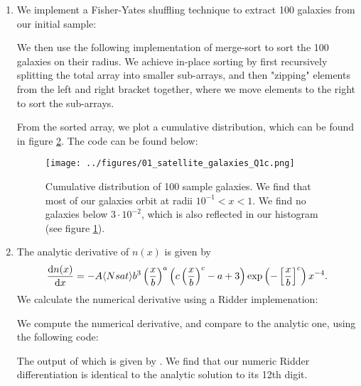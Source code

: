 \begin{enumerate}[label=(\alph*)]
{\begin{figure}[H]
    \label{fig:Q1b_hist}
\end{figure}
}
\item {We implement a Fisher-Yates shuffling technique to extract 100 galaxies from our initial sample: 

We then use the following implementation of merge-sort to sort the 100 galaxies on their radius. We achieve in-place sorting by first recursively splitting the total array into smaller sub-arrays, and then "zipping" elements from the left and right bracket together, where we move elements to the right to sort the sub-arrays. 

From the sorted array, we plot a cumulative distribution, which can be found in figure \ref{fig:Q1c_cum}. The code can be found below:


\begin{figure}[H]
    \centering
    \texttt{[image: ../figures/01\_satellite\_galaxies\_Q1c.png]}
    \caption{Cumulative distribution of 100 sample galaxies. We find that most of our galaxies orbit at radii $10^{-1} < x < 1$. We find no galaxies below $3\cdot10^{-2}$, which is also reflected in our histogram (see figure \ref{fig:Q1b_hist}).}
    \label{fig:Q1c_cum}
\end{figure}
}

\item {
The analytic derivative of $n(x)$ is given by
\begin{equation}
    \frac{\mathrm{d} n(x)}{\mathrm{d} x} = -A\langle Nsat\rangle b^3 \left(\frac{x}{b}\right)^a \left(c \left(\frac{x}{b}\right)^c - a + 3\right)\exp\left(-\left[\frac{x}{b}\right]^c\right) x^{-4}.
\end{equation}
We calculate the numerical derivative using a Ridder implemenation:

We compute the numerical derivative, and compare to the analytic one, using the following code:

The output of which is given by
.
We find that our numeric Ridder differentiation is identical to the analytic solution to its 12th digit.

}
\end{enumerate}